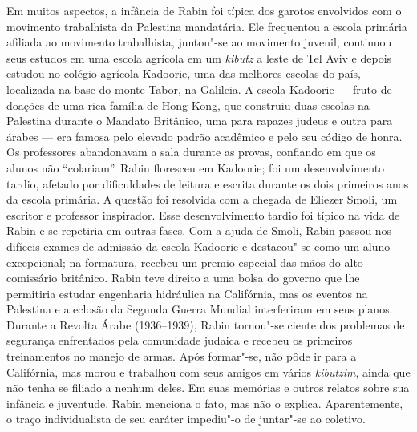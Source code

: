 Em muitos aspectos, a infância de Rabin foi típica dos garotos
envolvidos com o movimento trabalhista da Palestina mandatária. Ele
frequentou a escola primária afiliada ao movimento trabalhista,
juntou"-se ao movimento juvenil, continuou seus estudos em uma escola
agrícola em um \textit{kibutz} a leste de Tel Aviv e depois estudou no colégio
agrícola Kadoorie, uma das melhores escolas do país, localizada na base
do monte Tabor, na Galileia. A escola Kadoorie --- fruto de doações de uma rica
família de Hong Kong, que construiu duas escolas na Palestina durante o
Mandato Britânico, uma para rapazes judeus e outra para árabes --- era famosa pelo
elevado padrão acadêmico e pelo seu código de honra. Os professores
abandonavam a sala durante as provas, confiando em que os alunos não
``colariam''. Rabin floresceu em Kadoorie; foi um desenvolvimento
tardio, afetado por dificuldades de leitura e escrita durante os dois
primeiros anos da escola primária. A questão foi resolvida com a chegada
de Eliezer Smoli, um escritor e professor inspirador. Esse
desenvolvimento tardio foi típico na vida de Rabin e se repetiria em
outras fases. Com a ajuda de Smoli, Rabin passou nos difíceis exames de
admissão da escola Kadoorie e destacou"-se como um aluno excepcional;
na formatura, recebeu um premio especial das mãos do alto comissário
britânico. Rabin teve direito a uma bolsa do governo que lhe permitiria
estudar engenharia hidráulica na Califórnia, mas os eventos na Palestina
e a eclosão da Segunda Guerra Mundial interferiram em seus planos.
Durante a Revolta Árabe (1936--1939), Rabin tornou"-se ciente dos problemas
de segurança enfrentados pela comunidade judaica e recebeu os primeiros
treinamentos no manejo de armas. Após formar"-se, não pôde ir para a
Califórnia, mas morou e trabalhou com seus amigos em vários
\textit{kibutzim}, ainda que não tenha se filiado a nenhum deles. Em suas
memórias e outros relatos sobre sua infância e juventude, Rabin menciona
o fato, mas não o explica. Aparentemente, o traço individualista de seu
caráter impediu"-o de juntar"-se ao coletivo.

